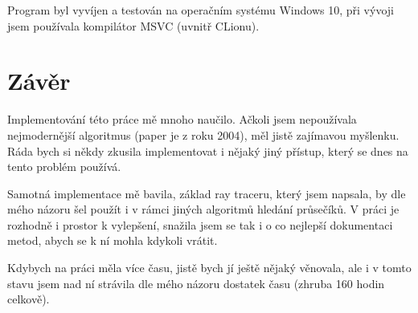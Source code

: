 \documentclass[report,11pt]{elsarticle}
\begin{document}
Program byl vyvíjen a testován na operačním systému Windows 10, při vývoji jsem používala kompilátor MSVC (uvnitř CLionu).


\section{\label{SEC:Conclusion}Závěr}

Implementování této práce mě mnoho naučilo. Ačkoli jsem nepoužívala nejmodernější algoritmus (paper je z roku 2004), měl jistě zajímavou myšlenku. Ráda bych si někdy zkusila implementovat i nějaký jiný přístup, který se dnes na tento problém používá.

Samotná implementace mě bavila, základ ray traceru, který jsem napsala, by dle mého názoru šel použít i v rámci jiných algoritmů hledání průsečíků. V práci je rozhodně i prostor k vylepšení, snažila jsem se tak i o co nejlepší dokumentaci metod, abych se k ní mohla kdykoli vrátit.

Kdybych na práci měla více času, jistě bych jí ještě nějaký věnovala, ale i v tomto stavu jsem nad ní strávila dle mého názoru dostatek času (zhruba 160 hodin celkově).
\end{document}
